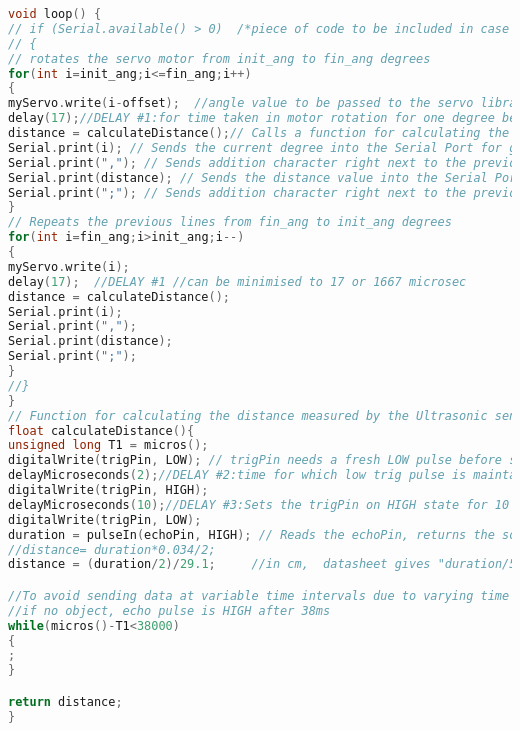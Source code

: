\begin{mdframed}[backgroundcolor=light-gray, roundcorner=10pt,leftmargin=1, rightmargin=1, innerleftmargin=15, innertopmargin=15,innerbottommargin=15, outerlinewidth=1, linecolor=light-gray]
\begin{lstlisting}[caption={The Arduino Code},language = C]
void loop() {
// if (Serial.available() > 0)  /*piece of code to be included in case of serial communication with IoT board*/
// {
// rotates the servo motor from init_ang to fin_ang degrees
for(int i=init_ang;i<=fin_ang;i++)
{  
myServo.write(i-offset);  //angle value to be passed to the servo library object for writing into the motor
delay(17);//DELAY #1:for time taken in motor rotation for one degree before calculating distance
distance = calculateDistance();// Calls a function for calculating the distance measured by the Ultrasonic sensor for each degree
Serial.print(i); // Sends the current degree into the Serial Port for graphical representation
Serial.print(","); // Sends addition character right next to the previous value needed later in the Processing IDE for indexing
Serial.print(distance); // Sends the distance value into the Serial Port for the graph
Serial.print(";"); // Sends addition character right next to the previous value needed later in the Processing IDE for indexing
}
// Repeats the previous lines from fin_ang to init_ang degrees
for(int i=fin_ang;i>init_ang;i--)
{  
myServo.write(i);
delay(17);  //DELAY #1 //can be minimised to 17 or 1667 microsec
distance = calculateDistance();
Serial.print(i);
Serial.print(",");
Serial.print(distance);
Serial.print(";");
}
//}
}
// Function for calculating the distance measured by the Ultrasonic sensor
float calculateDistance(){ 
unsigned long T1 = micros();
digitalWrite(trigPin, LOW); // trigPin needs a fresh LOW pulse before sending a HIGH pulse that can be detected from echoPin
delayMicroseconds(2);//DELAY #2:time for which low trig pulse is maintained before making it high
digitalWrite(trigPin, HIGH); 
delayMicroseconds(10);//DELAY #3:Sets the trigPin on HIGH state for 10 micro seconds
digitalWrite(trigPin, LOW);
duration = pulseIn(echoPin, HIGH); // Reads the echoPin, returns the sound wave travel time in microseconds
//distance= duration*0.034/2;
distance = (duration/2)/29.1;     //in cm,  datasheet gives "duration/58" as the formula

//To avoid sending data at variable time intervals due to varying time duration taken between execution of above code inside this function depending on distance of obstacle
//if no object, echo pulse is HIGH after 38ms
while(micros()-T1<38000)
{
;
}

return distance;
}
\end{lstlisting}

\end{mdframed}
\clearpage

